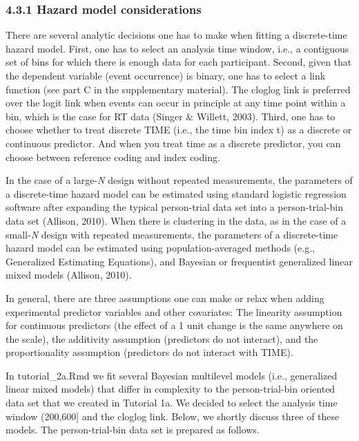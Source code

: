 \documentclass[
  man, donotrepeattitle,floatsintext]{apa6}
\begin{document}
\subsubsection{4.3.1 Hazard model considerations}\label{hazard-model-considerations}

There are several analytic decisions one has to make when fitting a discrete-time hazard model. First, one has to select an analysis time window, i.e., a contiguous set of bins for which there is enough data for each participant. Second, given that the dependent variable (event occurrence) is binary, one has to select a link function (see part C in the supplementary material). The cloglog link is preferred over the logit link when events can occur in principle at any time point within a bin, which is the case for RT data (Singer \& Willett, 2003). Third, one has to choose whether to treat discrete TIME (i.e., the time bin index t) as a discrete or continuous predictor. And when you treat time as a discrete predictor, you can choose between reference coding and index coding.

In the case of a large-\emph{N} design without repeated measurements, the parameters of a discrete-time hazard model can be estimated using standard logistic regression software after expanding the typical person-trial data set into a person-trial-bin data set (Allison, 2010). When there is clustering in the data, as in the case of a small-\emph{N} design with repeated measurements, the parameters of a discrete-time hazard model can be estimated using population-averaged methods (e.g., Generalized Estimating Equations), and Bayesian or frequentist generalized linear mixed models (Allison, 2010).

In general, there are three assumptions one can make or relax when adding experimental predictor variables and other covariates: The linearity assumption for continuous predictors (the effect of a 1 unit change is the same anywhere on the scale), the additivity assumption (predictors do not interact), and the proportionality assumption (predictors do not interact with TIME).

In tutorial\_2a.Rmd we fit several Bayesian multilevel models (i.e., generalized linear mixed models) that differ in complexity to the person-trial-bin oriented data set that we created in Tutorial 1a. We decided to select the analysis time window (200,600{]} and the cloglog link. Below, we shortly discuss three of these models. The person-trial-bin data set is prepared as follows.
\end{document}
